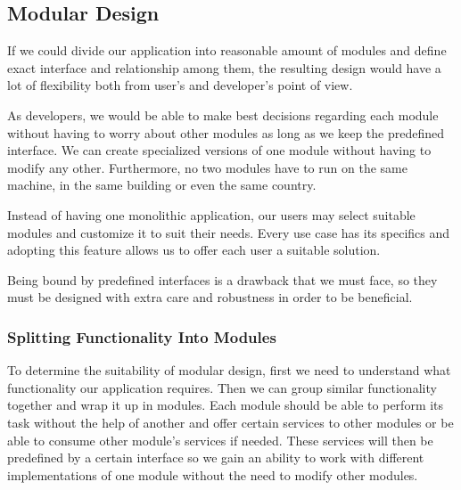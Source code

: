 \subsection{Modular Design}

If we could divide our application into reasonable amount of modules and define exact interface and relationship among them, the resulting design would have a lot of flexibility both from user's and developer's point of view.
\par
As developers, we would be able to make best decisions regarding each module without having to worry about other modules as long as we keep the predefined interface. We can create specialized versions of one module without having to modify any other. Furthermore, no two modules have to run on the same machine, in the same building or even the same country.
\par
Instead of having one monolithic application, our users may select suitable modules and customize it to suit their needs. Every use case has its specifics and adopting this feature allows us to offer each user a suitable solution.
\par
Being bound by predefined interfaces is a drawback that we must face, so they must be designed with extra care and robustness in order to be beneficial.

\subsubsection{Splitting Functionality Into Modules}
To determine the suitability of modular design, first we need to understand what functionality our application requires. Then we can group similar functionality together and wrap it up in modules. Each module should be able to perform its task without the help of another and offer certain services to other modules or be able to consume other module's services if needed. These services will then be predefined by a certain interface so we gain an ability to work with different implementations of one module without the need to modify other modules.

